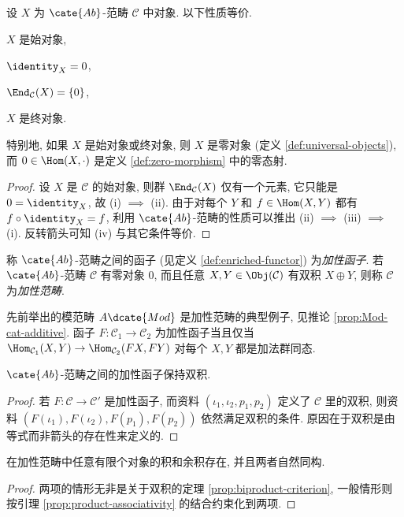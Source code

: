 \begin{lemma}
	设 $X$ 为 $\cate{Ab}$-范畴 $\mathcal{C}$ 中对象. 以下性质等价.
	\begin{compactenum}[(i)]
		\item $X$ 是始对象,
		\item $\identity_X = 0$,
		\item $\End_{\mathcal{C}}(X) = \{0\}$,
		\item $X$ 是终对象.
	\end{compactenum}
	特别地, 如果 $X$ 是始对象或终对象, 则 $X$ 是零对象 (定义 \ref{def:universal-objects}), 而 $0 \in \Hom(X, \cdot)$ 是定义 \ref{def:zero-morphism} 中的零态射.
\end{lemma}
\begin{proof}
	设 $X$ 是 $\mathcal{C}$ 的始对象, 则群 $\End_{\mathcal{C}}(X)$ 仅有一个元素, 它只能是 $0 = \identity_X$, 故 (i) $\implies$ (ii). 由于对每个 $Y$ 和 $f \in \Hom(X, Y)$ 都有 $f \circ \identity_X = f$, 利用 $\cate{Ab}$-范畴的性质可以推出 (ii) $\implies$ (iii) $\implies$ (i). 反转箭头可知 (iv) 与其它条件等价.
\end{proof}

\begin{definition}[加性函子与加性范畴]\label{def:additive-cat}
	称 $\cate{Ab}$-范畴之间的函子 (见定义 \ref{def:enriched-functor}) 为\emph{加性函子}. 若 $\cate{Ab}$-范畴 $\mathcal{C}$ 有零对象 $0$, 而且任意 $X, Y \in \Obj(\mathcal{C})$ 有双积 $X \oplus Y$, 则称 $\mathcal{C}$ 为\emph{加性范畴}. 
\end{definition}

先前举出的模范畴 $A\dcate{Mod}$ 是加性范畴的典型例子, 见推论 \ref{prop:Mod-cat-additive}. 函子 $F: \mathcal{C}_1 \to \mathcal{C}_2$ 为加性函子当且仅当 $\Hom_{\mathcal{C}_1}(X, Y) \to \Hom_{\mathcal{C}_2}(FX, FY)$ 对每个 $X, Y$ 都是加法群同态.

\begin{proposition}\label{prop:biproduct-preservation}
	$\cate{Ab}$-范畴之间的加性函子保持双积.
\end{proposition}
\begin{proof}
	若 $F: \mathcal{C} \to \mathcal{C}'$ 是加性函子, 而资料 $(\iota_1, \iota_2, p_1, p_2)$ 定义了 $\mathcal{C}$ 里的双积, 则资料 $(F(\iota_1), F(\iota_2), F(p_1), F(p_2))$ 依然满足双积的条件. 原因在于双积是由等式而非箭头的存在性来定义的.
\end{proof}

\begin{proposition}\label{prop:additive-prod-coprod}
	在加性范畴中任意有限个对象的积和余积存在, 并且两者自然同构.
\end{proposition}
\begin{proof}
	两项的情形无非是关于双积的定理 \ref{prop:biproduct-criterion}, 一般情形则按引理 \ref{prop:product-associativity} 的结合约束化到两项.
\end{proof}

